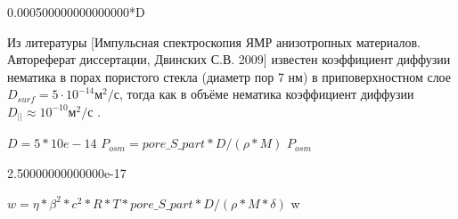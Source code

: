 \documentclass[11pt]{article}
\begin{document}
0.000500000000000000*D
        
    Из литературы {[}Импульсная спектроскопия ЯМР анизотропных материалов.
Автореферат диссертации, Двинских С.В. 2009{]} известен коэффициент
диффузии нематика в порах пористого стекла (диаметр пор 7 нм) в
приповерхностном слое \(D_{surf}=5\cdot10^{-14} м^2/с\), тогда как в
объёме нематика коэффициент диффузии \(D_{||}\approx10^{-10} м^2/с\) .


$D = 5*10e-14$
$P_{osm} = pore\_S\_part * D / (\rho * M)$
$P_{osm}$


2.50000000000000e-17

$w = \eta * \beta^2 * c^2 * R*T * pore\_S\_part * D / (\rho * M * \delta)$
w
        
\end{document}
